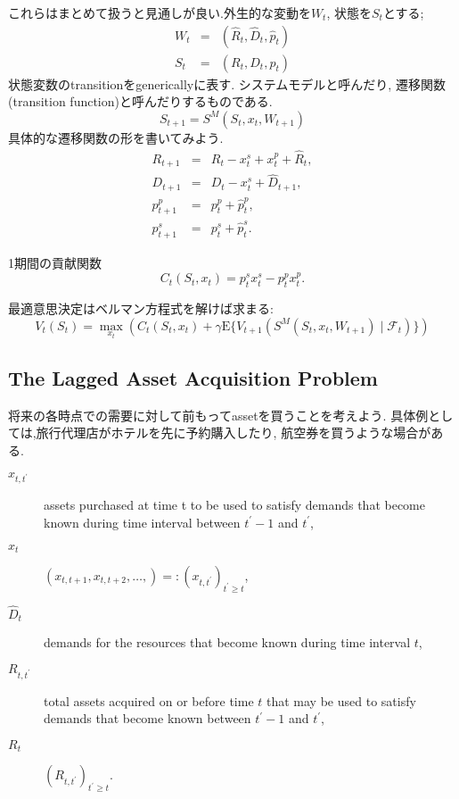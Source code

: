 \documentclass[11pt]{jsbook}
\begin{document}
これらはまとめて扱うと見通しが良い.外生的な変動を$W_t$, 状態を$S_t$とする;
\begin{eqnarray}
	W_t &=& (\hat{R}_t,\hat{D}_t, \hat{p}_t) \\
	S_t &=& (R_t, D_t, p_t)
\end{eqnarray}
状態変数のtransitionをgenericallyに表す.
システムモデルと呼んだり, 遷移関数(transition function)と呼んだりするものである.
\begin{equation}
	S_{t+1} = S^M (S_t, x_t, W_{t+1})
\end{equation}
具体的な遷移関数の形を書いてみよう.
\begin{eqnarray}
	R_{t+1} &=& R_t - x_t^s + x_t^p + \hat{R}_t,\\
	D_{t+1} &=& D_t - x_t^s + \hat{D}_{t+1},\\
	p_{t+1}^p &=& p_t^p + \hat{p}_t^p,\\
	p_{t+1}^s &=& p_t^s + \hat{p}_t^s.
\end{eqnarray}

1期間の貢献関数
\begin{equation}
	C_t(S_t, x_t) = p_t^s x_t^s - p_t^p x_t^p.
\end{equation}

最適意思決定はベルマン方程式を解けば求まる:
\begin{equation}
	V_t(S_t) = \max_{x_t} \left( C_t(S_t, x_t) + 
	\gamma \mathrm{E} \{ V_{t+1}(S^M(S_t, x_t, W_{t+1}) \mid \mathcal{F}_t) \} \right)
\end{equation}

\subsection{The Lagged Asset Acquisition Problem}
将来の各時点での需要に対して前もってassetを買うことを考えよう.
具体例としては,旅行代理店がホテルを先に予約購入したり, 航空券を買うような場合がある.

\begin{description}
	\item[$x_{t,t^{\prime}}$] assets purchased at time t to be used to satisfy demands that become
	known during time interval between $t^\prime -1$ and $t^\prime$,
	\item[$x_t$] $\left(x_{t,t+1}, x_{t,t+2}, \dots, \right) =: (x_{t,t^\prime})_{t^\prime \ge t}$,
	\item[$\hat{D}_t$] demands for the resources that become known during time interval $t$,
	\item[$R_{t,t^\prime}$] total assets acquired on or before time $t$ that may be used to satisfy
	demands that become known between $t^\prime -1$ and $t^\prime$,
	\item[$R_t$] $(R_{t,t^\prime})_{t^\prime \ge t}$.
\end{description}
\end{document}
